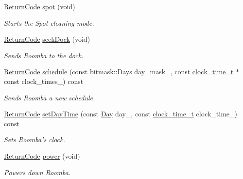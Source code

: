 \begin{DoxyCompactItemize}
\hyperlink{classroomba_1_1series500_1_1oi_1_1_o_i_encoder_ac2c8ad2f0306050926f89882d74696cc}{Return\+Code} \hyperlink{classroomba_1_1series500_1_1oi_1_1_o_i_encoder_a4a0dacfeeadc3fe61d86cc09a3f4357d}{spot} (void)
\begin{DoxyCompactList}\small\item\em Starts the Spot cleaning mode. \end{DoxyCompactList}\item 
\hyperlink{classroomba_1_1series500_1_1oi_1_1_o_i_encoder_ac2c8ad2f0306050926f89882d74696cc}{Return\+Code} \hyperlink{classroomba_1_1series500_1_1oi_1_1_o_i_encoder_a4995464b64134a5d8fbf5737ddd625be}{seek\+Dock} (void)
\begin{DoxyCompactList}\small\item\em Sends Roomba to the dock. \end{DoxyCompactList}\item 
\hyperlink{classroomba_1_1series500_1_1oi_1_1_o_i_encoder_ac2c8ad2f0306050926f89882d74696cc}{Return\+Code} \hyperlink{classroomba_1_1series500_1_1oi_1_1_o_i_encoder_a69fee4c553ddc88a6e3742a8e225dbf5}{schedule} (const bitmask\+::\+Days day\+\_\+mask\+\_\+, const \hyperlink{structroomba_1_1series500_1_1oi_1_1_o_i_encoder_1_1clock__time__t}{clock\+\_\+time\+\_\+t} $\ast$const clock\+\_\+times\+\_\+) const 
\begin{DoxyCompactList}\small\item\em Sends Roomba a new schedule. \end{DoxyCompactList}\item 
\hyperlink{classroomba_1_1series500_1_1oi_1_1_o_i_encoder_ac2c8ad2f0306050926f89882d74696cc}{Return\+Code} \hyperlink{classroomba_1_1series500_1_1oi_1_1_o_i_encoder_ab45c741ad238ae93592854dd13abe175}{set\+Day\+Time} (const \hyperlink{namespaceroomba_1_1series500_1_1oi_a46858f88a73ed1b4e2ebc7ede94d1d84}{Day} day\+\_\+, const \hyperlink{structroomba_1_1series500_1_1oi_1_1_o_i_encoder_1_1clock__time__t}{clock\+\_\+time\+\_\+t} clock\+\_\+time\+\_\+) const 
\begin{DoxyCompactList}\small\item\em Sets Roomba’s clock. \end{DoxyCompactList}\item 
\hyperlink{classroomba_1_1series500_1_1oi_1_1_o_i_encoder_ac2c8ad2f0306050926f89882d74696cc}{Return\+Code} \hyperlink{classroomba_1_1series500_1_1oi_1_1_o_i_encoder_a1e7270f7d8fc1c19659c08135c619f03}{power} (void)
\begin{DoxyCompactList}\small\item\em Powers down Roomba. \end{DoxyCompactList}\item 

\end{DoxyCompactItemize}
